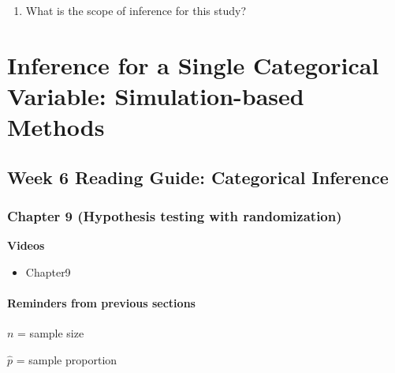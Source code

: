\documentclass[
]{report}
\providecommand{\tightlist}{%
  \setlength{\itemsep}{0pt}\setlength{\parskip}{0pt}}
\begin{document}
\vspace{0.5in}

\begin{enumerate}
\def\labelenumi{\alph{enumi}.}
\setcounter{enumi}{12}
\tightlist
\item
  What is the scope of inference for this study?
\end{enumerate}

\newpage

\hypertarget{inference-for-a-single-categorical-variable-simulation-based-methods}{%
\chapter{Inference for a Single Categorical Variable: Simulation-based Methods}\label{inference-for-a-single-categorical-variable-simulation-based-methods}}

\hypertarget{week-6-reading-guide-categorical-inference}{%
\section{Week 6 Reading Guide: Categorical Inference}\label{week-6-reading-guide-categorical-inference}}

\hypertarget{chapter-9-hypothesis-testing-with-randomization}{%
\subsection*{Chapter 9 (Hypothesis testing with randomization)}\label{chapter-9-hypothesis-testing-with-randomization}}

\textbf{Videos}

\begin{itemize}
\tightlist
\item
  Chapter9
\end{itemize}


\hypertarget{reminders-from-previous-sections}{%
\subsubsection*{Reminders from previous sections}\label{reminders-from-previous-sections}}

\(n\) = sample size

\(\hat{p}\) = sample proportion
\end{document}
